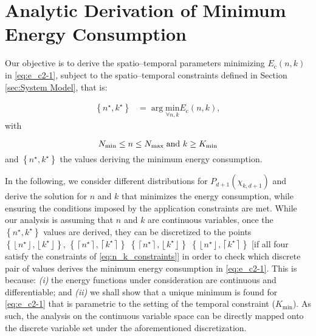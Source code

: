 \documentclass[twocolumn,english]{IEEEtran}
\theoremstyle{plain}
\theoremstyle{definition}
\begin{document}
\section{Analytic Derivation of Minimum Energy Consumption}

\label{sec:min_energy_analysis}

Our objective is to derive the spatio--temporal parameters minimizing
$E_{\text{c}}\left(n,k\right)$ in \eqref{eq:e_c2-1}, subject to
the spatio--temporal constraints defined in Section \ref{sec:System Model},
that is:




\begin{align}
\left\{ n^{\star},k^{\star}\right\}  & =\arg\underset{\forall n,k}{\text{min}}E_{\text{c}}\left(n,k\right),\label{eq:arg_min_Ec}
\end{align}
with

\begin{equation}
N_{\textnormal{min}}\le n\le N_{\textnormal{max}}\;\text{and }k\ge K_{\text{min}}\label{eq:n_k_constraints}
\end{equation}
and $\left\{ n^{\star},k^{\star}\right\} $ the values deriving the
minimum energy consumption.

In the following, we consider different distributions for $P_{d+1}\left(\chi_{k,d+1}\right)$
and derive the solution for $n$ and $k$ that minimizes the energy
consumption, while ensuring the conditions imposed by the application
constraints are met. While our analysis is assuming that $n$ and
$k$ are continuous variables, once the $\left\{ n^{\star},k^{\star}\right\} $
values are derived, they can be discretized to the points $\left\{ \left\lfloor n^{\star}\right\rfloor ,\left\lfloor k^{\star}\right\rfloor \right\} $,
$\left\{ \left\lceil n^{\star}\right\rceil ,\left\lceil k^{\star}\right\rceil \right\} $
$\left\{ \left\lceil n^{\star}\right\rceil ,\left\lfloor k^{\star}\right\rfloor \right\} $
$\left\{ \left\lfloor n^{\star}\right\rfloor ,\left\lceil k^{\star}\right\rceil \right\} $
{[}if all four satisfy the constraints of \eqref{eq:n_k_constraints}{]}
in order to check which discrete pair of values derives the minimum
energy consumption in \eqref{eq:e_c2-1}. This is because: \emph{(i)}
the energy functions under consideration are continuous and differentiable;
and \emph{(ii)} we shall show that a unique minimum is found for \eqref{eq:e_c2-1}
that is parametric to the setting of the temporal constraint ($K_{\text{min}}$).
As such, the analysis on the continuous variable space can be directly
mapped onto the discrete variable set under the aforementioned discretization.
\end{document}
